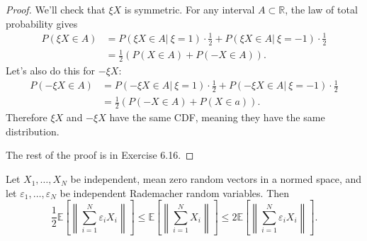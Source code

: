 \begin{proof}
We'll check that $\xi X$ is symmetric. For any interval $A \subset \mathbb{R}$, the law of total probability 
gives 
\begin{align*}
	P(\xi X \in A) 
	&= P(\xi X \in A | \ \xi = 1) \cdot \frac{1}{2} + P(\xi X \in A | \ \xi = -1) \cdot \frac{1}{2} \\
	&= \frac{1}{2}(P(X \in A) + P(-X \in A)).
\end{align*}
Let's also do this for $-\xi X$: 
\begin{align*}
	P(-\xi X \in A) 
	&= P(-\xi X \in A | \ \xi = 1) \cdot \frac{1}{2} + P(-\xi X \in A | \ \xi = -1) \cdot \frac{1}{2} \\
	&= \frac{1}{2}(P(-X \in A) + P(X \in a)).
\end{align*}
Therefore $\xi X$ and $-\xi X$ have the same CDF, meaning they have the same distribution.

The rest of the proof is in Exercise 6.16.
\end{proof}

\begin{lemma}[Symmetrization]
\label{lem:6.3.2}
Let $X_1, \dots, X_N$ be independent, mean zero random vectors in a normed space, and let $\varepsilon_1, 
\dots, \varepsilon_N$ be independent Rademacher random variables. Then 
\[ \frac{1}{2}\mathbb{E}\left[ \left\lVert \sum_{i = 1}^{N} \varepsilon_i X_i \right\rVert_{} \right] 
\leq \mathbb{E}\left[ \left\lVert \sum_{i = 1}^{N} X_i \right\rVert_{} \right] 
\leq 2 \mathbb{E}\left[ \left\lVert \sum_{i = 1}^{N} \varepsilon_i X_i \right\rVert_{} \right]. \]
\end{lemma}

